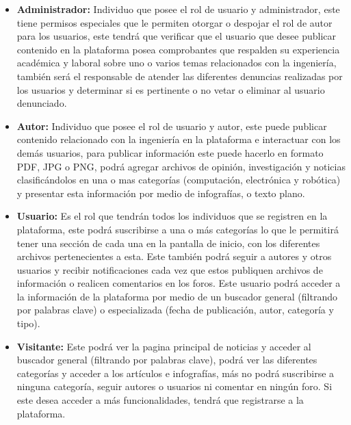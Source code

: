\documentclass[a4paper,12 pt]{article}
\begin{document}
\begin{itemize}
    \item \textbf{Administrador:} Individuo que posee el rol de usuario y administrador,
    este tiene permisos especiales que le permiten otorgar o despojar el rol de autor
    para los usuarios, este tendrá que verificar que el usuario que desee publicar
    contenido en la plataforma posea comprobantes que respalden su experiencia académica
    y laboral sobre uno o varios temas relacionados con la ingeniería, también será el
    responsable de atender las diferentes denuncias realizadas por los usuarios y
    determinar si es pertinente o no vetar o eliminar al usuario denunciado.
    
    \item \textbf{Autor:} Individuo que posee el rol de usuario y autor, este puede 
    publicar contenido relacionado con la ingeniería en la plataforma e interactuar
    con los demás usuarios, para publicar información este puede hacerlo en formato
    PDF, JPG o PNG, podrá agregar archivos de opinión, investigación y noticias
    clasificándolos en una o mas categorías (computación, electrónica y robótica)
    y presentar esta información por medio de infografías, o texto plano.
    
    \item \textbf{Usuario:} Es el rol que tendrán todos los individuos que se
    registren en la plataforma, este podrá suscribirse a una o más categorías lo que
    le permitirá tener una sección de cada una en la pantalla de inicio, con los
    diferentes archivos pertenecientes a esta. Este también podrá seguir a autores y
    otros usuarios y recibir notificaciones cada vez que estos publiquen archivos de
    información o realicen comentarios en los foros. Este usuario podrá acceder a la
    información de la plataforma por medio de un buscador general (filtrando por
    palabras clave) o especializada (fecha de publicación, autor, categoría y tipo).
    
    \item \textbf{Visitante:} Este podrá ver la pagina principal de noticias y
    acceder al buscador general (filtrando por palabras clave), podrá ver las
    diferentes categorías y acceder a los artículos e infografías, más no podrá
    suscribirse a ninguna categoría, seguir autores o usuarios ni comentar en ningún
    foro. Si este desea acceder a más funcionalidades, tendrá que registrarse a la
    plataforma.
\end{itemize}{}
\end{document}
